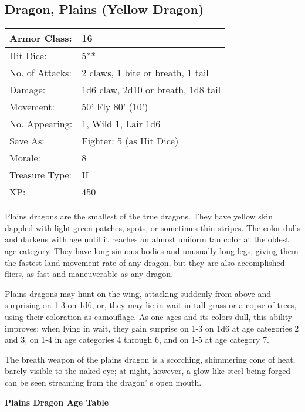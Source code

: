 \documentclass[a4paper,twoside,openany,10pt]{book}
\begin{document}
\begin{multicols}{2}
\begin{center}
\end{center}
	
\subsection*{Dragon, Plains (Yellow Dragon)}\label{dragon-plains-yellow-dragon}

\begin{tabularx}{0.48\textwidth}{@{}lX@{}}
Armor Class: & 16 \\\hline
Hit Dice: & 5**  \\\hline
No. of Attacks: & 2 claws, 1 bite or breath, 1 tail \\\hline
Damage: & 1d6 claw, 2d10 or breath, 1d8 tail \\\hline
Movement: & 50' Fly 80'
(10') \\\hline
No. Appearing: & 1, Wild 1, Lair 1d6 \\\hline
Save As: & Fighter: 5 (as Hit Dice) \\\hline
Morale: & 8 \\\hline
Treasure Type: & H \\\hline
XP: & 450 \\\hline
\end{tabularx}\medskip

Plains dragons are the smallest of the true dragons. They have yellow skin dappled with light green patches, spots, or sometimes thin stripes. The color dulls and darkens with age until it reaches an almost uniform tan color at the oldest age category. They have long sinuous bodies and unusually long legs, giving them the fastest land movement rate of any dragon, but they are also accomplished fliers, as fast and maneuverable as any dragon.

Plains dragons may hunt on the wing, attacking suddenly from above and surprising on 1-3 on 1d6; or, they may lie in wait in tall grass or a copse of trees, using their coloration as camouflage. As one ages and its colors dull, this ability improves; when lying in wait, they gain surprise on 1-3 on 1d6 at age categories 2 and 3, on 1-4 in age categories 4 through 6, and on 1-5 at age category 7.

The breath weapon of the plains dragon is a scorching, shimmering cone of heat, barely visible to the naked eye; at night, however, a glow like steel being forged can be seen streaming from the dragon' s open mouth.\\

\begin{center}
	\textbf{Plains Dragon Age Table}\\


\end{center}
\end{multicols}
\end{document}
